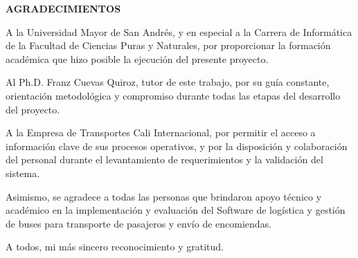 \thispagestyle{plain}  %


\begin{center}
	{\bfseries\fontsize{13pt}{16pt}\selectfont AGRADECIMIENTOS}
\end{center}

\vspace{1em}

A la Universidad Mayor de San Andrés, y en especial a la Carrera de Informática de la Facultad de Ciencias Puras y Naturales, por proporcionar la formación académica que hizo posible la ejecución del presente proyecto.

Al Ph.D. Franz Cuevas Quiroz, tutor de este trabajo, por su guía constante, orientación metodológica y compromiso durante todas las etapas del desarrollo del proyecto.

A la Empresa de Transportes Cali Internacional, por permitir el acceso a información clave de sus procesos operativos, y por la disposición y colaboración del personal durante el levantamiento de requerimientos y la validación del sistema.

Asimismo, se agradece a todas las personas que brindaron apoyo técnico y académico en la implementación y evaluación del Software de logística y gestión de buses para transporte de pasajeros y envío de encomiendas.

A todos, mi más sincero reconocimiento y gratitud.